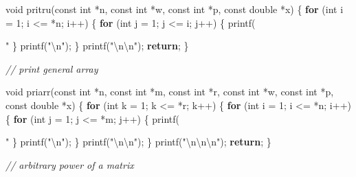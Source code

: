\documentclass[12pt,]{article}
\newenvironment{Shaded}{\begin{snugshade}}{\end{snugshade}}
\newcommand{\DataTypeTok}[1]{\textcolor[rgb]{0.13,0.29,0.53}{#1}}
\newcommand{\DecValTok}[1]{\textcolor[rgb]{0.00,0.00,0.81}{#1}}
\newcommand{\SpecialCharTok}[1]{\textcolor[rgb]{0.00,0.00,0.00}{#1}}
\newcommand{\StringTok}[1]{\textcolor[rgb]{0.31,0.60,0.02}{#1}}
\newcommand{\CommentTok}[1]{\textcolor[rgb]{0.56,0.35,0.01}{\textit{#1}}}
\newcommand{\ControlFlowTok}[1]{\textcolor[rgb]{0.13,0.29,0.53}{\textbf{#1}}}
\newcommand{\NormalTok}[1]{#1}
\begin{document}
\begin{Shaded}
\begin{Highlighting}[]
{{{\DataTypeTok{void}\NormalTok{ pritru(}\DataTypeTok{const} \DataTypeTok{int}\NormalTok{ *n, }\DataTypeTok{const} \DataTypeTok{int}\NormalTok{ *w, }\DataTypeTok{const} \DataTypeTok{int}\NormalTok{ *p, }\DataTypeTok{const} \DataTypeTok{double}\NormalTok{ *x) \{}
    \ControlFlowTok{for}\NormalTok{ (}\DataTypeTok{int}\NormalTok{ i = }\DecValTok{1}\NormalTok{; i <= *n; i++) \{}
        \ControlFlowTok{for}\NormalTok{ (}\DataTypeTok{int}\NormalTok{ j = }\DecValTok{1}\NormalTok{; j <= i; j++) \{}
\NormalTok{            printf(}\StringTok{" %
\NormalTok{        \}}
\NormalTok{        printf(}\StringTok{"}\SpecialCharTok{\textbackslash{}n}\StringTok{"}\NormalTok{);}
\NormalTok{    \}}
\NormalTok{    printf(}\StringTok{"}\SpecialCharTok{\textbackslash{}n\textbackslash{}n}\StringTok{"}\NormalTok{);}
    \ControlFlowTok{return}\NormalTok{;}
\NormalTok{\}}

\CommentTok{// print general array}

\DataTypeTok{void}\NormalTok{ priarr(}\DataTypeTok{const} \DataTypeTok{int}\NormalTok{ *n, }\DataTypeTok{const} \DataTypeTok{int}\NormalTok{ *m, }\DataTypeTok{const} \DataTypeTok{int}\NormalTok{ *r, }\DataTypeTok{const} \DataTypeTok{int}\NormalTok{ *w,}
            \DataTypeTok{const} \DataTypeTok{int}\NormalTok{ *p, }\DataTypeTok{const} \DataTypeTok{double}\NormalTok{ *x) \{}
    \ControlFlowTok{for}\NormalTok{ (}\DataTypeTok{int}\NormalTok{ k = }\DecValTok{1}\NormalTok{; k <= *r; k++) \{}
        \ControlFlowTok{for}\NormalTok{ (}\DataTypeTok{int}\NormalTok{ i = }\DecValTok{1}\NormalTok{; i <= *n; i++) \{}
            \ControlFlowTok{for}\NormalTok{ (}\DataTypeTok{int}\NormalTok{ j = }\DecValTok{1}\NormalTok{; j <= *m; j++) \{}
\NormalTok{                printf(}\StringTok{" %
\NormalTok{            \}}
\NormalTok{            printf(}\StringTok{"}\SpecialCharTok{\textbackslash{}n}\StringTok{"}\NormalTok{);}
\NormalTok{        \}}
\NormalTok{        printf(}\StringTok{"}\SpecialCharTok{\textbackslash{}n\textbackslash{}n}\StringTok{"}\NormalTok{);}
\NormalTok{    \}}
\NormalTok{    printf(}\StringTok{"}\SpecialCharTok{\textbackslash{}n\textbackslash{}n\textbackslash{}n}\StringTok{"}\NormalTok{);}
    \ControlFlowTok{return}\NormalTok{;}
\NormalTok{\}}

\CommentTok{// arbitrary power of a matrix}

}}}}}
\end{Highlighting}
\end{Shaded}
\end{document}
